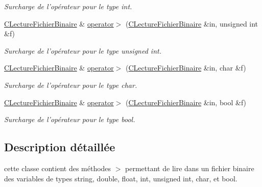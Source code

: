 \begin{DoxyCompactItemize}
\begin{DoxyCompactList}\small\item\em Surcharge de l'opérateur pour le type {\itshape int}. \end{DoxyCompactList}\item 
\hypertarget{class_c_lecture_fichier_binaire_a10555985d21e9277fd610554eb804ad4}{\hyperlink{class_c_lecture_fichier_binaire}{C\-Lecture\-Fichier\-Binaire} \& \hyperlink{class_c_lecture_fichier_binaire_a10555985d21e9277fd610554eb804ad4}{operator$>$} (\hyperlink{class_c_lecture_fichier_binaire}{C\-Lecture\-Fichier\-Binaire} \&in, unsigned int \&f)}\label{class_c_lecture_fichier_binaire_a10555985d21e9277fd610554eb804ad4}

\begin{DoxyCompactList}\small\item\em Surcharge de l'opérateur pour le type {\itshape unsigned} {\itshape int}. \end{DoxyCompactList}\item 
\hypertarget{class_c_lecture_fichier_binaire_a4a3ac4fa35e1f11664f6612d554d72bd}{\hyperlink{class_c_lecture_fichier_binaire}{C\-Lecture\-Fichier\-Binaire} \& \hyperlink{class_c_lecture_fichier_binaire_a4a3ac4fa35e1f11664f6612d554d72bd}{operator$>$} (\hyperlink{class_c_lecture_fichier_binaire}{C\-Lecture\-Fichier\-Binaire} \&in, char \&f)}\label{class_c_lecture_fichier_binaire_a4a3ac4fa35e1f11664f6612d554d72bd}

\begin{DoxyCompactList}\small\item\em Surcharge de l'opérateur pour le type {\itshape char}. \end{DoxyCompactList}\item 
\hypertarget{class_c_lecture_fichier_binaire_aaf7fbfa5e060c1e9015b0ffbd013f3e3}{\hyperlink{class_c_lecture_fichier_binaire}{C\-Lecture\-Fichier\-Binaire} \& \hyperlink{class_c_lecture_fichier_binaire_aaf7fbfa5e060c1e9015b0ffbd013f3e3}{operator$>$} (\hyperlink{class_c_lecture_fichier_binaire}{C\-Lecture\-Fichier\-Binaire} \&in, bool \&f)}\label{class_c_lecture_fichier_binaire_aaf7fbfa5e060c1e9015b0ffbd013f3e3}

\begin{DoxyCompactList}\small\item\em Surcharge de l'opérateur pour le type {\itshape bool}. \end{DoxyCompactList}\end{DoxyCompactItemize}


\subsection{Description détaillée}
cette classe contient des méthodes $>$ permettant de lire dans un fichier binaire des variables de types string, double, float, int, unsigned int, char, et bool. 

